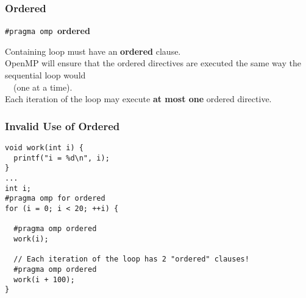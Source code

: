 \documentclass[aspectratio=43]{beamer}
\newenvironment{changemargin}[1]{%
  \begin{list}{}{%
    \setlength{\topsep}{0pt}%
    \setlength{\leftmargin}{#1}%
    \setlength{\rightmargin}{1em}
    \setlength{\listparindent}{\parindent}%
    \setlength{\itemindent}{\parindent}%
    \setlength{\parsep}{\parskip}%
  }%
  \item[]}{\end{list}}
\begin{document}
\begin{frame}
  \frametitle{Ordered}

  \begin{changemargin}{2.5cm}
  \begin{center}
    {\tt \#pragma omp }{\bf ordered}
  \end{center}

    Containing loop must have an {\bf ordered} clause.\\[1em]
    OpenMP will ensure that the ordered directives are executed the same
      way the sequential loop would\\~~(one at a time).\\[1em]
    Each iteration of the loop may execute {\bf at most one} ordered
      directive.
  \end{changemargin}

\end{frame}

\begin{frame}[fragile]
  \frametitle{Invalid Use of Ordered}

  \begin{changemargin}{1.5cm}

  \begin{lstlisting}
void work(int i) {
  printf("i = %d\n", i);
}
...
int i;
#pragma omp for ordered
for (i = 0; i < 20; ++i) {

  #pragma omp ordered
  work(i);

  // Each iteration of the loop has 2 "ordered" clauses!
  #pragma omp ordered 
  work(i + 100);
}
  \end{lstlisting}
  \end{changemargin}


\end{frame}
\end{document}
